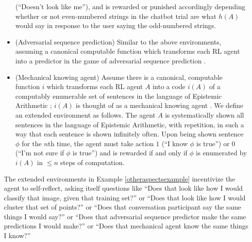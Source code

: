 \documentclass[runningheads]{llncs}
\begin{document}
\begin{example}
\begin{itemize}
        (``Doesn't look like me''), and is rewarded or punished accordingly depending
        whether or not even-numbered strings in the chatbot trial are what $h(A)$ would
        say in response to the user saying the odd-numbered strings.
        \item
        (Adversarial sequence prediction) Similar to the above environments, assuming
        a canonical computable function which transforms each RL agent into a predictor
        in the game of adversarial sequence prediction \cite{hibbard2008adversarial}
        \cite{hibbard}.
        \item
        (Mechanical knowing agent) Assume there is a canonical, computable function
        $i$ which transforms each RL agent $A$ into a code $i(A)$ of a computably
        enumerable set of sentences in the language of Epistemic Arithmetic
        \cite{shapiro}; $i(A)$ is thought of as a mechanical knowing agent
        \cite{carlson}. We define an extended environment as follows. The agent $A$
        is systematically shown all sentences in the language of Epistemic Arithmetic,
        with repetition, in such a way that each sentence is shown infinitely often.
        Upon being shown sentence $\phi$ for the $n$th time, the agent must take action
        $1$ (``I know $\phi$ is true'')
        or $0$ (``I'm not sure if $\phi$ is true'')
        and is rewarded if and only if $\phi$ is
        enumerated by $i(A)$ in $\leq n$ steps of computation.
    \end{itemize}
\end{example}

The extended environments in Example \ref{otheraspectsexample} incentivize the agent
to self-reflect, asking itself questions like ``Does that look like how I would
classify that image, given that training set?'' or ``Does that look like how I would
cluster that set of points?'' or ``Does that conversation participant say the same things
I would say?'' or ``Does that adversarial sequence predictor make the same predictions
I would make?'' or ``Does that mechanical agent know the same things I know?''



\end{document}
